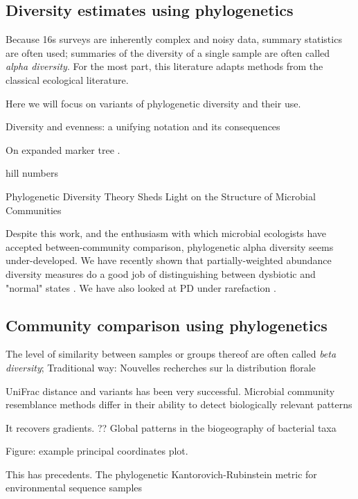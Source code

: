 \documentclass{amsart}
\begin{document}
\subsection{Diversity estimates using phylogenetics}
Because 16s surveys are inherently complex and noisy data, summary statistics are often used; summaries of the diversity of a single sample are often called \emph{alpha diversity}.
For the most part, this literature adapts methods from the classical ecological literature.

Here we will focus on variants of phylogenetic diversity and their use.

\cite{hill1973diversity}
Diversity and evenness: a unifying notation and its consequences

On expanded marker tree \cite{kembel2011phylogenetic}.

hill numbers
\cite{chao2010phylogenetic}

\cite{odwyer2012phylogenetic}
Phylogenetic Diversity Theory Sheds Light on the Structure of Microbial Communities

Despite this work, and the enthusiasm with which microbial ecologists have accepted between-community comparison, phylogenetic alpha diversity seems under-developed.
We have recently shown that partially-weighted abundance diversity measures do a good job of distinguishing between dysbiotic and "normal" states \cite{mccoy2013abundance}.
We have also looked at PD under rarefaction \cite{nipperess2013mean}.


\subsection{Community comparison using phylogenetics}

The level of similarity between samples or groups thereof are often called \emph{beta diversity};
Traditional way: \cite{jaccard1908nouvelles} Nouvelles recherches sur la distribution florale

UniFrac distance and variants has been very successful.
\cite{LozuponeKnightUniFrac05}
\cite{LozuponeEaWeightedUnifrac07}
\cite{kuczynski2010microbial} Microbial community resemblance methods differ in their ability to detect biologically relevant patterns

It recovers gradients.
\cite{nemergut2011global}
?? Global patterns in the biogeography of bacterial taxa

Figure: example principal coordinates plot.

This has precedents.
\cite{evans2012phylogenetic}
The phylogenetic Kantorovich-Rubinstein metric for environmental sequence samples
\end{document}
